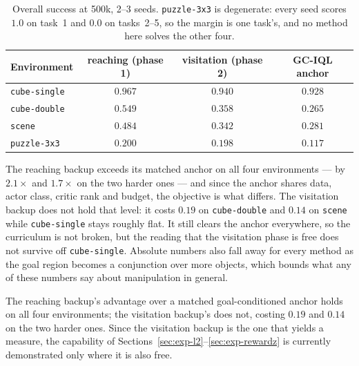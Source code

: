 \begin{table}[t]
\centering\footnotesize
\begin{tabular}{l c c c}
\toprule
Environment & reaching (phase 1) & visitation (phase 2) & GC-IQL anchor \\
\midrule
\texttt{cube-single} & $\mathbf{0.967}$ & $0.940$ & $0.928$ \\
\texttt{cube-double} & $\mathbf{0.549}$ & $0.358$ & $0.265$ \\
\texttt{scene}       & $\mathbf{0.484}$ & $0.342$ & $0.281$ \\
\texttt{puzzle-3x3}  & $0.200$ & $0.198$ & $0.117$ \\
\bottomrule
\end{tabular}
\caption{Overall success at 500k, 2--3 seeds. \texttt{puzzle-3x3} is degenerate:
every seed scores $1.0$ on task~1 and $0.0$ on tasks~2--5, so the margin is one
task's, and no method here solves the other four.}
\label{tab:suite}
\end{table}

The reaching backup exceeds its matched anchor on all four environments --- by
$2.1\times$ and $1.7\times$ on the two harder ones --- and since the anchor shares
data, actor class, critic rank and budget, the objective is what differs. The
visitation backup does not hold that level: it costs $0.19$ on
\texttt{cube-double} and $0.14$ on \texttt{scene} while \texttt{cube-single} stays
roughly flat. It still clears the anchor everywhere, so the curriculum is not
broken, but the reading that the visitation phase is free does not survive off
\texttt{cube-single}. Absolute numbers also fall away for every method as the goal
region becomes a conjunction over more objects, which bounds what any of these
numbers say about manipulation in general.

\begin{takeaway}
The reaching backup's advantage over a matched goal-conditioned anchor holds on
all four environments; the visitation backup's does not, costing $0.19$ and $0.14$
on the two harder ones. Since the visitation backup is the one that yields a
measure, the capability of Sections~\ref{sec:exp-l2}--\ref{sec:exp-rewardz} is
currently demonstrated only where it is also free.
\end{takeaway}
